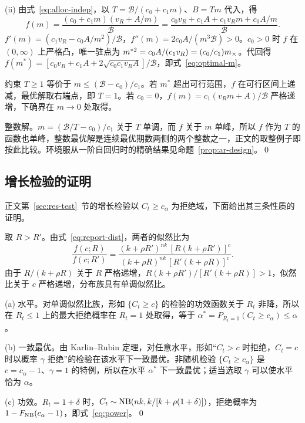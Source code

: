 (ii) 由式~\eqref{eq:alloc-indep}，以 $T=\mathcal B/(c_0+c_1m)$、$B=Tm$ 代入，得
\begin{equation}
  f(m)=\frac{(c_0+c_1m)(v_R+A/m)}{\mathcal B}=\frac{c_0v_R+c_1A+c_1v_Rm+c_0A/m}{\mathcal B}.
\end{equation}
$f'(m)=(c_1v_R-c_0A/m^2)/\mathcal B$，$f''(m)=2c_0A/(m^3\mathcal B)>0$。$c_0>0$ 时 $f$ 在 $(0,\infty)$ 上严格凸，唯一驻点为 $m^{*2}=c_0A/(c_1v_R)=(c_0/c_1)m_{\times}$。代回得 $f(m^*)=[c_0v_R+c_1A+2\sqrt{c_0c_1v_RA}]/\mathcal B$，即式~\eqref{eq:optimal-m}。

约束 $T\geq1$ 等价于 $m\leq(\mathcal B-c_0)/c_1$。若 $m^*$ 超出可行范围，$f$ 在可行区间上递减，最优解取右端点，即 $T=1$。若 $c_0=0$，$f(m)=c_1(v_Rm+A)/\mathcal B$ 严格递增，下确界在 $m\to0$ 处取得。

整数解。$m=(\mathcal B/T-c_0)/c_1$ 关于 $T$ 单调，而 $f$ 关于 $m$ 单峰，所以 $f$ 作为 $T$ 的函数也单峰，整数最优解是连续最优期数两侧的两个整数之一，正文的取整例子即按此比较。环境服从一阶自回归时的精确结果见命题~\ref{prop:ar-design}。\qed

\subsection{增长检验的证明}
\label{sec:s-test}

正文第~\ref{sec:res-test}~节的增长检验以 $C_t\geq c_\alpha$ 为拒绝域，下面给出其三条性质的证明。

取 $R>R'$。由式~\eqref{eq:report-dist}，两者的似然比为
\begin{equation}
  \frac{f(c;R)}{f(c;R')}=\frac{(k+\rho R')^{nk}\,[R(k+\rho R')]^{c}}{(k+\rho R)^{nk}\,[R'(k+\rho R)]^{c}}.
\end{equation}
由于 $R/(k+\rho R)$ 关于 $R$ 严格递增，$R(k+\rho R')/[R'(k+\rho R)]>1$，似然比关于 $c$ 严格递增，分布族具有单调似然比。

(a) 水平。对单调似然比族，形如 $\{C_t\geq c\}$ 的检验的功效函数关于 $R_t$ 非降\citep{lehmann2005testing}，所以在 $R_t\leq1$ 上的最大拒绝概率在 $R_t=1$ 处取得，等于 $\alpha^*=P_{R_t=1}(C_t\geq c_\alpha)\leq\alpha$。

(b) 一致最优。由 Karlin--Rubin 定理\citep{karlin1956theory}，对任意水平，形如“$C_t>c$ 时拒绝，$C_t=c$ 时以概率 $\gamma$ 拒绝”的检验在该水平下一致最优。非随机检验 $\{C_t\geq c_\alpha\}$ 是 $c=c_\alpha-1$、$\gamma=1$ 的特例，所以在水平 $\alpha^*$ 下一致最优；适当选取 $\gamma$ 可以使水平恰为 $\alpha$。

(c) 功效。$R_t=1+\delta$ 时，$C_t\sim\operatorname{NB}(nk,k/[k+\rho(1+\delta)])$，拒绝概率为 $1-F_{\operatorname{NB}}(c_\alpha-1)$，即式~\eqref{eq:power}。\qed

